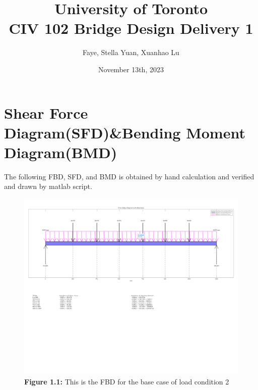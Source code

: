 \documentclass[12pt,titlepage,a4paper]{article}
\begin{document}
\title{University of Toronto \\ CIV 102 Bridge Design Delivery 1}
\author{Faye, Stella Yuan, Xuanhao Lu}
\date{November 13th, 2023}
\maketitle


\section{Shear Force Diagram(SFD)\&Bending Moment Diagram(BMD)}
    The following FBD, SFD, and BMD is obtained by hand calculation and verified and drawn by matlab script.
    \begin{figure}[H]
        \centering
        \includegraphics[width=13cm]{Delivery_1_FBD.png}
        \caption*{\textbf{Figure 1.1:} This is the FBD for the base case of load condition 2}
        \label{fig:enter-label}
    \end{figure}
\end{document}
